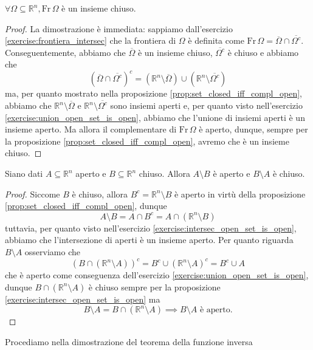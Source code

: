 \begin{lemma}
    $\forall \Omega \subseteq \mathbb{R}^n, \text{Fr} \, \Omega$ è un insieme chiuso.
    \label{lemma:frontiera_chiusa}
\end{lemma}
\begin{proof}
    La dimostrazione è immediata: sappiamo dall'esercizio \ref{exercise:frontiera_intersec} che la frontiera di $\Omega$ è definita come $\text{Fr} \, \Omega = \overline{\Omega} \cap \overline{\Omega^c}$. Conseguentemente,
    abbiamo che $\overline{\Omega}$ è un insieme chiuso, $\overline{\Omega^c}$ è chiuso e abbiamo che
    $$
        (\overline{\Omega} \cap \overline{\Omega^c})^c = (\mathbb{R}^n \setminus \overline{\Omega}) \cup (\mathbb{R}^n \setminus \overline{\Omega^c})
    $$
    ma, per quanto mostrato nella proposizione \ref{prop:set_closed_iff_compl_open}, abbiamo che $\mathbb{R}^n \setminus \overline{\Omega}$ e $\mathbb{R}^n \setminus \overline{\Omega^c}$ sono insiemi aperti e, per quanto visto nell'esercizio \ref{exercise:union_open_set_is_open}, abbiamo che
    l'unione di insiemi aperti è un insieme aperto. Ma allora il complementare di $\text{Fr} \, \Omega$ è aperto, dunque, sempre per la proposizione \ref{prop:set_closed_iff_compl_open}, avremo che è un insieme chiuso.
\end{proof}
\begin{lemma}
    Siano dati $A \subseteq \mathbb{R}^n$ aperto e $B \subseteq \mathbb{R}^n$ chiuso. Allora $A \setminus B$ è aperto e $B \setminus A$ è chiuso.
    \label{lemma:diff_open_closed_set}
\end{lemma}
\begin{proof}
    Siccome $B$ è chiuso, allora $B^c = \mathbb{R}^n \setminus B$ è aperto in virtù della proposizione \ref{prop:set_closed_iff_compl_open}, dunque 
    $$
    A \setminus B = A \cap B^c = A \cap (\mathbb{R}^n \setminus B)
    $$
    tuttavia, per quanto visto nell'esercizio \ref{exercise:intersec_open_set_is_open}, abbiamo che l'intersezione di aperti è un insieme aperto. Per quanto riguarda $B \setminus A$ osserviamo che
    $$
    (B \cap (\mathbb{R}^n \setminus A))^c = B^c \cup (\mathbb{R}^n \setminus A)^c = B^c \cup A
    $$
    che è aperto come conseguenza dell'esercizio \ref{exercise:union_open_set_is_open}, dunque $B \cap (\mathbb{R}^n \setminus A)$ è chiuso sempre per la proposizione \ref{exercise:intersec_open_set_is_open} ma
    $$
    B \setminus A = B \cap (\mathbb{R}^n \setminus A) \implies B \setminus A \text{ è aperto.}
    $$
\end{proof}
Procediamo nella dimostrazione del teorema della funzione inversa
